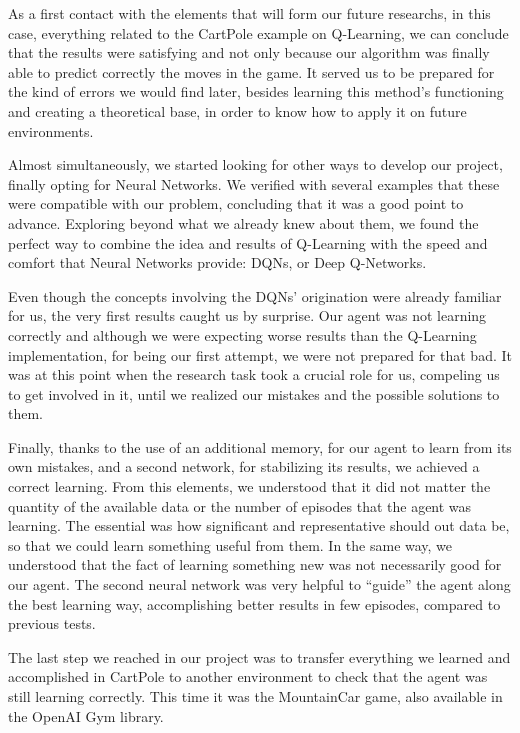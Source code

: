 As a first contact with the elements that will form our future researchs, in this case, everything related to the CartPole example on Q-Learning, we can conclude that the results were satisfying and not only because our algorithm was finally able to predict correctly the moves in the game. It served us to be prepared for the kind of errors we would find later, besides learning this method's functioning and creating a theoretical base, in order to know how to apply it on future environments.

Almost simultaneously, we started looking for other ways to develop our project, finally opting for Neural Networks. We verified with several examples that these were compatible with our problem, concluding that it was a good point to advance. Exploring beyond what we already knew about them, we found the perfect way to combine the idea and results of Q-Learning with the speed and comfort that Neural Networks provide: DQNs, or Deep Q-Networks.

Even though the concepts involving the DQNs' origination were already familiar for us, the very first results caught us by surprise. Our agent was not learning correctly and although we were expecting worse results than the Q-Learning implementation, for being our first attempt, we were not prepared for that bad. It was at this point when the research task took a crucial role for us, compeling us to get involved in it, until we realized our mistakes and the possible solutions to them.

Finally, thanks to the use of an additional memory, for our agent to learn from its own mistakes, and a second network, for stabilizing its results, we achieved a correct learning. From this elements, we understood that it did not matter the quantity of the available data or the number of episodes that the agent was learning. The essential was how significant and representative should out data be, so that we could learn something useful from them. In the same way, we understood that the fact of learning something new was not necessarily good for our agent. The second neural network was very helpful to ``guide'' the agent along the best learning way, accomplishing better results in few episodes, compared to previous tests.

The last step we reached in our project was to transfer everything we learned and accomplished in CartPole to another environment to check that the agent was still learning correctly. This time it was the MountainCar game, also available in the OpenAI Gym library. 


